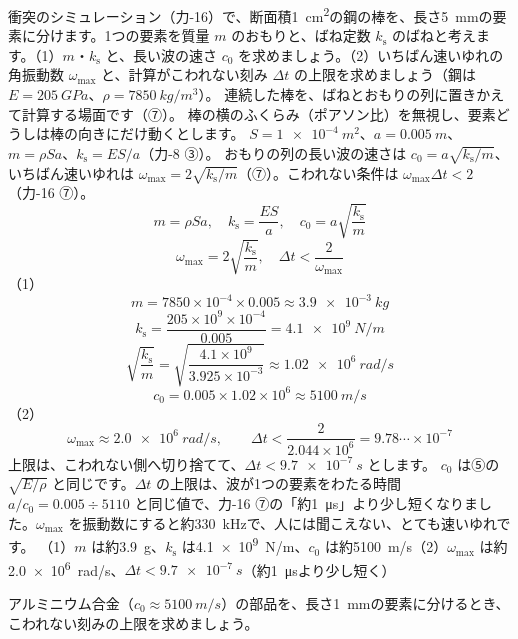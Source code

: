 \label{ph:波-5:ex11}
\begin{phreidai}
衝突のシミュレーション（力-16）で、断面積\qty{1}{cm^2}の鋼の棒を、長さ\qty{5}{mm}の要素に分けます。1つの要素を質量 $m$ のおもりと、ばね定数 $k_{\mathrm s}$ のばねと考えます。（1）$m$・$k_{\mathrm s}$ と、長い波の速さ $c_0$ を求めましょう。（2）いちばん速いゆれの角振動数 $\omega_{\max}$ と、計算がこわれない刻み $\Delta t$ の上限を求めましょう（鋼は $E=\qty{205}{GPa}$、$\rho=\qty{7850}{kg/m^3}$）。
\phbamen
連続した棒を、ばねとおもりの列に置きかえて計算する場面です（⑦）。
\phmushi
棒の横のふくらみ（ポアソン比）を無視し、要素どうしは棒の向きにだけ動くとします。
\phzu
$S=\qty{1e-4}{m^2}$、$a=\qty{0.005}{m}$、$m=\rho Sa$、$k_{\mathrm s}=ES/a$（力-8 ③）。
\phriyu
おもりの列の長い波の速さは $c_0=a\sqrt{k_{\mathrm s}/m}$、いちばん速いゆれは $\omega_{\max}=2\sqrt{k_{\mathrm s}/m}$（⑦）。こわれない条件は $\omega_{\max}\Delta t<2$（力-16 ⑦）。
\phtateru
\[m=\rho Sa,\quad k_{\mathrm s}=\frac{ES}{a},\quad c_0=a\sqrt{\frac{k_{\mathrm s}}{m}}\]
\[\omega_{\max}=2\sqrt{\frac{k_{\mathrm s}}{m}},\quad\Delta t<\frac{2}{\omega_{\max}}\]
\phtoku
（1）\[m=7850\times10^{-4}\times0.005\approx\qty{3.9e-3}{kg}\]
\[k_{\mathrm s}=\frac{205\times10^9\times10^{-4}}{0.005}=\qty{4.1e9}{N/m}\]
\[\sqrt{\frac{k_{\mathrm s}}{m}}=\sqrt{\frac{4.1\times10^9}{3.925\times10^{-3}}}\approx\qty{1.02e6}{rad/s}\]
\[c_0=0.005\times1.02\times10^6\approx\qty{5100}{m/s}\]
（2）\[\omega_{\max}\approx\qty{2.0e6}{rad/s},\qquad\Delta t<\frac{2}{2.044\times10^6}=9.78\cdots\times10^{-7}\]
上限は、こわれない側へ切り捨てて、$\Delta t<\qty{9.7e-7}{s}$ とします。
\phtashikame
$c_0$ は⑤の $\sqrt{E/\rho}$ と同じです。$\Delta t$ の上限は、波が1つの要素をわたる時間 $a/c_0=0.005\div5110$ と同じ値で、力-16 ⑦の「約\qty{1}{\micro s}」より少し短くなりました。$\omega_{\max}$ を振動数にすると約\qty{330}{kHz}で、人には聞こえない、とても速いゆれです。
\kotae （1）$m$ は約\qty{3.9}{g}、$k_{\mathrm s}$ は\qty{4.1e9}{N/m}、$c_0$ は約\qty{5100}{m/s}（2）$\omega_{\max}$ は約\qty{2.0e6}{rad/s}、$\Delta t<\qty{9.7e-7}{s}$（約\qty{1}{\micro s}より少し短く）
\end{phreidai}
\begin{jibun}
アルミニウム合金（$c_0\approx\qty{5100}{m/s}$）の部品を、長さ\qty{1}{mm}の要素に分けるとき、こわれない刻みの上限を求めましょう。
\end{jibun}

